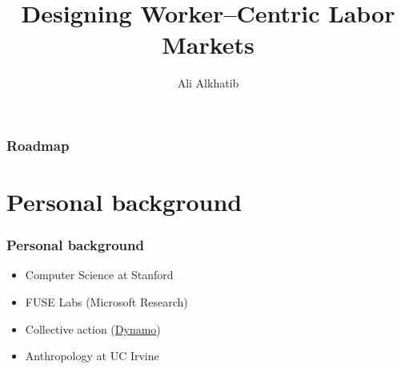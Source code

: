 \documentclass{beamer}
\title[Worker--Centric Markets]{Designing Worker--Centric Labor Markets} %
\author{Ali Alkhatib}
\institute[Stanford/FUSE Labs] %
{
Stanford University, FUSE Labs \\ %
\medskip
\texttt{ali.alkhatib@cs.stanford.edu\\@alialkhatib\_} %
}
\date{\usdate{\formatdate{13}{11}{2015}}}
\begin{document}
\begin{frame}
\titlepage %
\end{frame}

\begin{frame}
\frametitle{Roadmap} %
\tableofcontents %
\end{frame}


\section{Personal background}
\begin{frame}
  \frametitle{Personal background}
  \begin{itemize}
    \item Computer Science at Stanford
    \item FUSE Labs (Microsoft Research)
    \item Collective action (\href{http://www.wearedynamo.org}{Dynamo})
    \item Anthropology at UC Irvine
  \end{itemize}
\end{frame}
\end{document}
